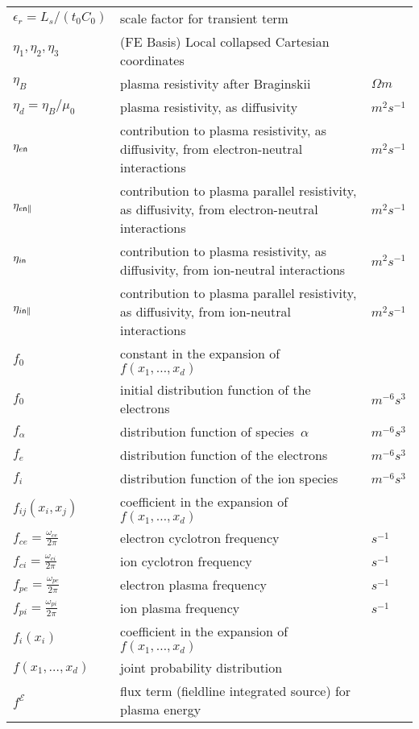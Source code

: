 \begin{longtable}{|p{3.0cm}|p{10.0cm}|p{3.0cm}|}
$\epsilon_r=L_s/(t_0 C_0)$ & scale factor for transient term  & \\
$\eta_1, \eta_2, \eta_3$ &  (FE Basis) Local collapsed Cartesian coordinates & \\
$\eta_B$ & plasma resistivity after Braginskii  &  $\Omega m$ \\
$\eta_d=\eta_B/\mu_0$ & plasma resistivity, as diffusivity  &  $m^2 s^{-1}$ \\
$\eta_{e{\sf n}}$ & contribution to plasma resistivity, as diffusivity, from electron-neutral interactions  &  $m^2 s^{-1}$ \\
$\eta_{e{\sf n}\|}$ & contribution to plasma parallel resistivity, as diffusivity, from electron-neutral interactions  &  $m^2 s^{-1}$ \\
$\eta_{i{\sf n}}$ & contribution to plasma resistivity, as diffusivity, from ion-neutral interactions  &  $m^2 s^{-1}$ \\
$\eta_{i{\sf n}\|}$ & contribution to plasma parallel resistivity, as diffusivity, from ion-neutral interactions  &  $m^2 s^{-1}$ \\
$f_0$ & constant in the expansion of $f\left(x_1,\ldots,x_d\right)$  & \\
$f_0$ & initial distribution function of the electrons & $m^{-6} s^3$ \\
$f_\alpha$ & distribution function of species~$\alpha$ & $m^{-6} s^3$ \\
$f_e$ & distribution function of the electrons & $m^{-6} s^3$ \\
$f_i$ & distribution function of the ion species & $m^{-6} s^3$ \\
$f_{ij}(x_i,x_j)$ & coefficient in the expansion of $f\left(x_1,\ldots,x_d\right)$  & \\
$f_{ce}= \frac{\omega_{ce}}{2\pi}$ & electron cyclotron frequency & $s^{-1}$ \\
$f_{ci}= \frac{\omega_{ci}}{2\pi}$ & ion cyclotron frequency & $s^{-1}$ \\
$f_{pe}= \frac{\omega_{pe}}{2\pi}$ & electron plasma frequency & $s^{-1}$ \\
$f_{pi}= \frac{\omega_{pi}}{2\pi}$ & ion plasma frequency & $s^{-1}$ \\
$f_i(x_i)$ & coefficient in the expansion of $f\left(x_1,\ldots,x_d\right)$  & \\
$f\left(x_1,\ldots,x_d\right)$ & joint probability distribution  & \\
$f^\mathcal{E}$ & flux term (fieldline integrated source) for plasma energy  & \\

\end{longtable}
